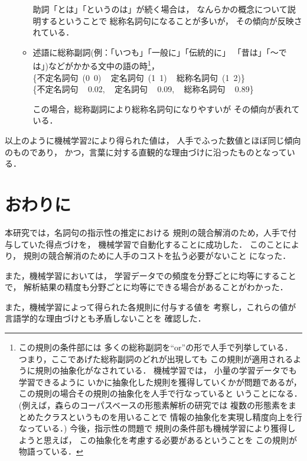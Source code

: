 \begin{enumerate}
\begin{itemize}
    助詞「とは」「というのは」が続く場合は，
    なんらかの概念について説明するということで
    総称名詞句になることが多いが，
    その傾向が反映されている．

  \item 
    述語に総称副詞(例：「いつも」「一般に」「伝統的に」
    「昔は」「〜では」)などがかかる文中の語の時\footnote{
この規則の条件部には
多くの総称副詞を``or''の形で人手で列挙している．
つまり，ここであげた総称副詞のどれが出現しても
この規則が適用されるように規則の抽象化がなされている．
機械学習では，
小量の学習データでも学習できるように
いかに抽象化した規則を獲得していくかが問題であるが，
この規則の場合その規則の抽象化を人手で行なっていると
いうことになる．
(例えば，森らのコーパスベースの形態素解析の研究\cite{mori_nlp98}では
複数の形態素をまとめたクラスというものを用いることで
情報の抽象化を実現し精度向上を行なっている．)
今後，指示性の問題で
規則の条件部も機械学習により獲得しようと思えば，
この抽象化を考慮する必要があるということを
この規則が物語っている．}，\\
    \mbox{\{\mbox{不定名詞句} (0 0) \,
      \mbox{定名詞句}   (1 1) \,
      \mbox{総称名詞句} (1 2)\}}\\
    \mbox{\{\mbox{不定名詞句}  \, 0.02, \,
      \mbox{定名詞句}    \, 0.09, \,
      \mbox{総称名詞句}  \, 0.89\}}

    この場合，総称副詞により総称名詞句になりやすいが
    その傾向が表れている．
    

  \end{itemize}

\end{enumerate}

以上のように機械学習2により得られた値は，
人手でふった数値とほぼ同じ傾向のものであり，
かつ，言葉に対する直観的な理由づけに沿ったものとなっている．


\section{おわりに}\label{sec:end}
本研究では，名詞句の指示性の推定における
規則の競合解消のため，人手で付与していた得点づけを，
機械学習で自動化することに成功した．
このことにより，
規則の競合解消のために人手のコストを払う必要がないこと
になった．

また，機械学習においては，
学習データでの頻度を分野ごとに均等にすることで，
解析結果の精度も分野ごとに均等にできる場合があることがわかった．

また，機械学習によって得られた各規則に付与する値を
考察し，これらの値が言語学的な理由づけとも矛盾しないことを
確認した．

